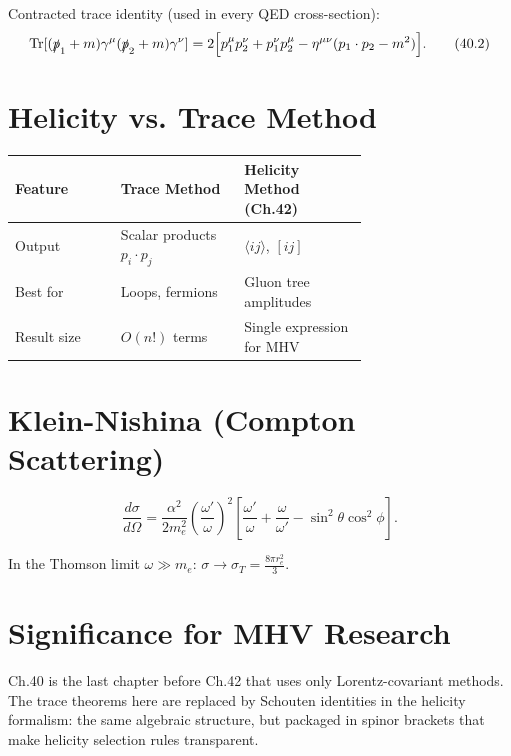 Contracted trace identity (used in every QED cross-section):
\begin{equation}
\operatorname{Tr}[(\slashed{p}_1+m)\gamma^\mu(\slashed{p}_2+m)\gamma^\nu]
= 2\Bigl[p_1^\mu p_2^\nu + p_1^\nu p_2^\mu
         -\eta^{\mu\nu}(p_1\cdot p_2-m^2)\Bigr] .
\tag{40.2}
\end{equation}

\section{Helicity vs. Trace Method}\label{sec:vs_helicity}
\begin{center}
\begin{tabular}{|l|p{0.35\linewidth}|p{0.35\linewidth}|}
\hline
Feature & Trace Method & Helicity Method (Ch.42) \\
\hline
Output & Scalar products $p_i\cdot p_j$ & $\langle ij\rangle$, $[ij]$ \\
Best for & Loops, fermions & Gluon tree amplitudes \\
Result size & $O(n!)$ terms & Single expression for MHV \\
\hline
\end{tabular}
\end{center}

\section{Klein-Nishina (Compton Scattering)}\label{sec:compton}
\begin{mdframed}[backgroundcolor=red!5]
\begin{equation}
\frac{d\sigma}{d\Omega}
= \frac{\alpha^2}{2m_e^2}
\left(\frac{\omega'}{\omega}\right)^2
\left[\frac{\omega'}{\omega}+\frac{\omega}{\omega'}
-\sin^2\theta\cos^2\phi\right] .
\tag{40.$\star\star$}
\end{equation}
\end{mdframed}
In the Thomson limit $\omega\gg m_e$: $\sigma\to\sigma_T=\frac{8\pi r_e^2}{3}$.

\section{Significance for MHV Research}
Ch.40 is the last chapter before Ch.42 that uses only Lorentz-covariant
methods.  The trace theorems here are replaced by Schouten identities in the
helicity formalism: the same algebraic structure, but packaged in spinor
brackets that make helicity selection rules transparent.
